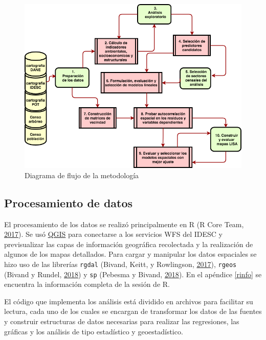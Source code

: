 \documentclass[12pt,a4paper,oneside, openany]{book}
\theoremstyle{definition}
\theoremstyle{definition}
\theoremstyle{definition}
\theoremstyle{remark}
\begin{document}
\begin{figure}[H]

{\centering \includegraphics[width=1\linewidth]{images/flujograma} 

}

\caption{Diagrama de flujo de la metodología}\label{fig:flujograma}
\end{figure}

\subsection{Procesamiento de datos}\label{procesamiento-de-datos}

El procesamiento de los datos se realizó principalmente en R (R Core
Team, \protect\hyperlink{ref-R-base}{2017}). Se usó
\href{http://www.qgis.org/es/site/}{QGIS} para conectarse a los
servicios WFS del IDESC y previsualizar las capas de información
geográfica recolectada y la realización de algunos de los mapas
detallados. Para cargar y manipular los datos espaciales se hizo uso de
las librerías \texttt{rgdal} (Bivand, Keitt, y Rowlingson,
\protect\hyperlink{ref-R-rgdal}{2017}), \texttt{rgeos} (Bivand y Rundel,
\protect\hyperlink{ref-R-rgeos}{2018}) y \texttt{sp} (Pebesma y Bivand,
\protect\hyperlink{ref-R-sp}{2018}). En el apéndice \ref{rinfo} se
encuentra la información completa de la sesión de R.

El código que implementa los análisis está dividido en archivos para
facilitar su lectura, cada uno de los cuales se encargan de transformar
los datos de las fuentes y construir estructuras de datos necesarias
para realizar las regresiones, las gráficas y los análisis de tipo
estadístico y geoestadístico.
\end{document}
